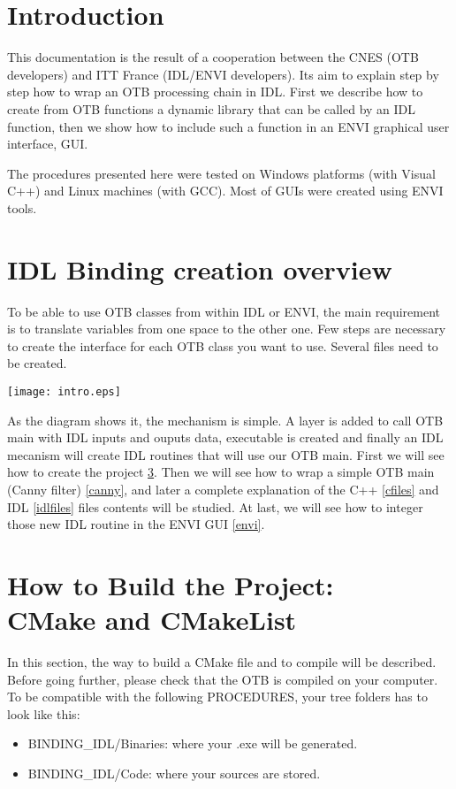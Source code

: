 
\section{Introduction}

This documentation is the result of a cooperation between the CNES (OTB developers) and ITT France (IDL/ENVI developers). Its aim to explain step by step how to wrap an OTB processing chain in IDL. First we describe how to create from OTB functions a dynamic library that can be called by an IDL function, then we show how to include such a function in an ENVI graphical user interface, GUI.

The procedures presented here were tested on Windows platforms (with Visual C++) and Linux machines (with GCC). Most of GUIs were created using ENVI tools.

\section{IDL Binding creation overview}

To be able to use OTB classes from within IDL or ENVI, the main requirement is to translate variables from one space to the other one. Few steps are necessary to create the interface for each OTB class you want to use. Several files need to be created.

 \begin{minipage}[b]{.46\linewidth}
        \centering\texttt{[image: intro.eps]}
 \end{minipage}

As the diagram shows it, the mechanism is simple. A layer is added to call OTB main with IDL inputs and ouputs data, executable is created and finally an IDL mecanism will create IDL routines that will use our OTB main.
First we will see how to create the project \ref{buildProject}. Then we will see how to wrap a simple OTB main (Canny filter) \ref{canny}, and later a complete explanation of
the C++ \ref{cfiles} and IDL \ref{idlfiles} files contents will be studied. At last, we will see how to integer those new IDL routine in the ENVI GUI \ref{envi}.

\section{How to Build the Project:\\ CMake and CMakeList}
\label{buildProject}
In this section, the way to build a CMake file and to compile will be described.
Before going further, please check that the OTB is compiled on your computer.
To be compatible with the following PROCEDURES, your tree folders has to look like this:
\begin{itemize}
\item BINDING\_IDL/Binaries: where your .exe will be generated.
\item BINDING\_IDL/Code: where your sources are stored.
\end{itemize}

